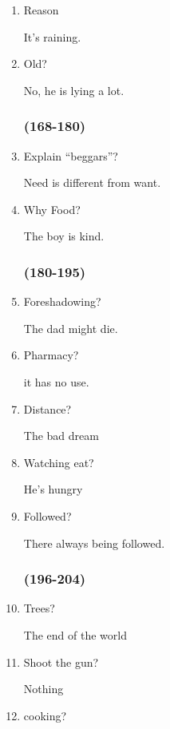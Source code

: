 \begin{multicols}{3}
\begin{enumerate}
    \item Reason

    It’s raining.

    \item Old?

    No, he is lying a lot.

    \subsubsection{(168-180)}

    \item Explain “beggars”?

    Need is different from want.

    \item Why Food?

    The boy is kind.

    \subsubsection{(180-195)}

    \item Foreshadowing?

    The dad might die.

    \item Pharmacy?

    it has no use.

    \item Distance?

    The bad dream

    \item Watching eat?

    He’s hungry

    \item Followed?

    There always being followed.

    \subsubsection{(196-204)}

    \item Trees?

    The end of the world
    
    \item Shoot the gun?

    Nothing

    \item cooking?


\end{enumerate}
\end{multicols}
